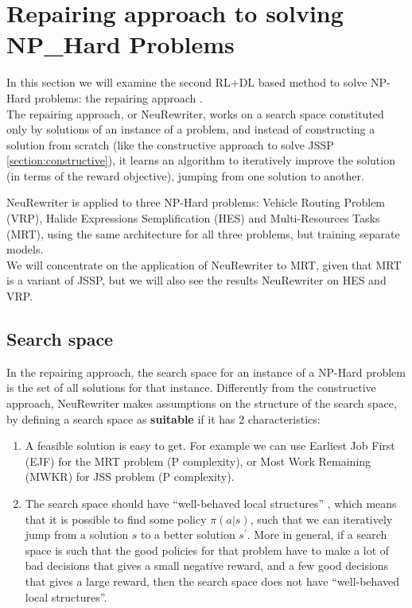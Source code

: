 \documentclass[12pt]{article}
\begin{document}
\medbreak
\section{Repairing approach to solving NP\_Hard Problems}
\label{section:repairing}
In this section we will examine the second RL+DL based method to solve NP-Hard problems: the repairing approach \cite{neu_rewriter}.\\
The repairing approach, or NeuRewriter, works on a search space constituted only by solutions of an instance of a problem, and instead of constructing a solution from scratch (like the constructive approach to solve JSSP \ref{section:constructive}), 
it learns an algorithm to iteratively improve the solution (in terms of the reward objective), jumping from one solution to another.

\medbreak
NeuRewriter is applied to three NP-Hard problems: Vehicle Routing Problem (VRP), Halide Expressions Semplification (HES) and Multi-Resources Tasks (MRT), using the same architecture for all three problems, but training separate models.\\
 We will concentrate on the application of NeuRewriter to MRT, given that MRT is a variant of JSSP, but we will also see the results NeuRewriter on HES and VRP.

 \medbreak
\subsection{Search space}
In the repairing approach, the search space for an instance of a NP-Hard problem is the set of all solutions for that instance. Differently from the constructive approach, NeuRewriter makes assumptions on the structure of the search space, by defining a search space as \textbf{suitable} \cite{neu_rewriter} if it has 2 characteristics:
\begin{enumerate}
    \item A feasible solution is easy to get. For example we can use Earliest Job First (EJF) for the MRT problem (P complexity), or Most Work Remaining (MWKR) for JSS problem (P complexity).
    \item The search space should have ``well-behaved local structures'' \cite{neu_rewriter}, which means that it is possible to find some policy $\pi(a|s)$, such that we can iteratively jump from a solution $s$ to a better solution $s^{\prime}$.
     More in general, if a search space is such that the good policies for that problem have to make a lot of bad decisions that gives a small negative reward, and a few good decisions that gives a large reward, then the search space does not have ``well-behaved local structures''.
\end{enumerate}
\end{document}
